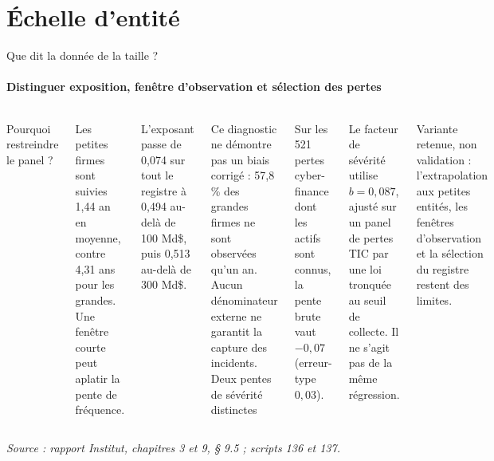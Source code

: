 \documentclass[aspectratio=169,10pt,t]{beamer}
\newcommand{\source}[1]{\par\vfill{\tiny\color{gris}\textit{Source : #1}}\par\vspace{-1mm}}
\begin{document}
\section{Échelle d'entité}
\begin{frame}{Que dit la donnée de la taille ?}
  \framesubtitle{\ajout Distinguer exposition, fenêtre d'observation et sélection des pertes}
  \begin{columns}[T,onlytextwidth]
    \footnotesize
    {\editorial\normalsize Pourquoi restreindre le panel ?}\par\vspace{1.5mm}
    Les petites firmes sont suivies 1,44 an en moyenne, contre 4,31 ans pour les grandes. Une fenêtre courte peut aplatir la pente de fréquence.\par\vspace{1.5mm}
    L'exposant passe de 0,074 sur tout le registre à 0,494 au-delà de 100 Md\$, puis 0,513 au-delà de 300 Md\$.\par\vspace{1.5mm}
    Ce diagnostic ne démontre pas un biais corrigé : 57,8\,\% des grandes firmes ne sont observées qu'un an. Aucun dénominateur externe ne garantit la capture des incidents.
    \footnotesize
    {\editorial\normalsize Deux pentes de sévérité distinctes}\par\vspace{1.5mm}
    Sur les 521 pertes cyber-finance dont les actifs sont connus, la pente brute vaut $-0{,}07$ (erreur-type $0{,}03$).\par\vspace{1.5mm}
    Le facteur de sévérité utilise $b=0{,}087$, ajusté sur un panel de pertes TIC par une loi tronquée au seuil de collecte. Il ne s'agit pas de la même régression.\par\vspace{1.5mm}
    {\color{accent}Variante retenue, non validation :} l'extrapolation aux petites entités, les fenêtres d'observation et la sélection du registre restent des limites.
  \end{columns}
  \source{rapport Institut, chapitres 3 et 9, § 9.5 ; scripts 136 et 137.}
\end{frame}
\end{document}
